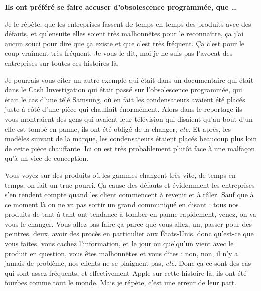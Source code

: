 \begin{small}
\textbf{Ils ont préféré se faire accuser d'obsolescence programmée, que \dots}
\smallbreak


Je le répète, que les entreprises fassent de temps en temps des produits avec des défauts, et qu'ensuite elles soient très malhonnêtes pour le reconnaître, ça j'ai aucun souci pour dire que ça existe et que c'est très fréquent. Ça c'est pour le coup vraiment très fréquent. Je vous le dit, moi je ne suis pas l'avocat des entreprises sur toutes ces histoires-là.

Je pourrais vous citer un autre exemple qui était dans un documentaire qui était dans le Cash Investigation qui était passé sur l'obsolescence programmée, qui était le cas d'une télé Samsung, où en fait les condensateurs avaient été placés juste à côté d'une pièce qui chauffait énormément. Alors dans le reportage ils vous montraient des gens qui avaient leur télévision qui disaient qu'au bout d'un elle est tombé en panne, ils ont été obligé de la changer, \textit{etc.} Et après, les modèles suivant de la marque, les condensateurs étaient placés beaucoup plus loin de cette pièce chauffante. Ici on est très probablement plutôt face à une malfaçon qu'à un vice de conception. 

Vous voyez sur des produits où les gammes changent très vite, de temps en temps, on fait un truc pourri. Ça cause des défauts et évidemment les entreprises s'en rendent compte quand les client commencent à revenir et à râler. Sauf que à ce moment là on ne va pas sortir un grand communiqué en disant : tous nos produits de tant à tant ont tendance à tomber en panne rapidement, venez, on va vous le changer. Vous allez pas faire ça parce que vous allez, un, passer pour des \og peintres\fg{}, deux, avoir des procès en particulier aux États-Unis, donc qu'est-ce que vous faites, vous cachez l'information, et le jour ou quelqu'un vient avec le produit en question, vous êtes malhonnêtes et vous dîtes : non, non, il n'y a jamais de problème, nos clients ne se plaignent pas, \textit{etc.} Donc ça ce sont des cas qui sont assez fréquents, et effectivement Apple sur cette histoire-là, ils ont été fourbes comme tout le monde. Mais je répète, c'est une erreur de leur part. 


\end{small}
